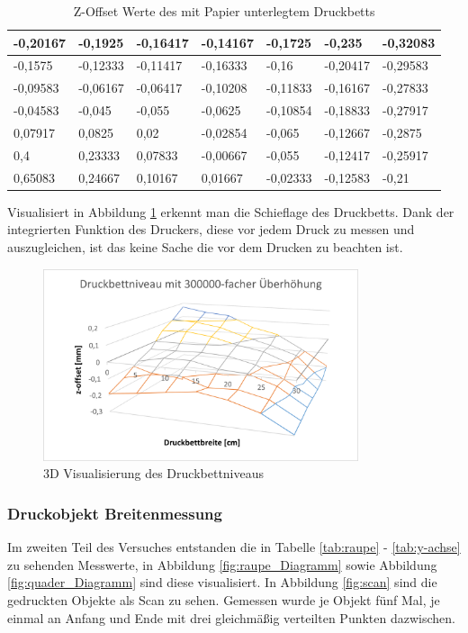\documentclass[a4paper,12pt,bibtotocnumbered]{scrartcl}
\numberwithin{equation}{section} %
\begin{document}
\begin{table}[H]
\centering
\caption{Z-Offset Werte des mit Papier unterlegtem Druckbetts}
\label{tab:druckbett2}
\begin{tabular}{|l|l|l|l|l|l|l|}
\hline
-0,20167 & -0,1925  & -0,16417 & -0,14167 & -0,1725  & -0,235   & -0,32083 \\ \hline
-0,1575  & -0,12333 & -0,11417 & -0,16333 & -0,16    & -0,20417 & -0,29583 \\ \hline
-0,09583 & -0,06167 & -0,06417 & -0,10208 & -0,11833 & -0,16167 & -0,27833 \\ \hline
-0,04583 & -0,045   & -0,055   & -0,0625  & -0,10854 & -0,18833 & -0,27917 \\ \hline
0,07917  & 0,0825   & 0,02     & -0,02854 & -0,065   & -0,12667 & -0,2875  \\ \hline
0,4      & 0,23333  & 0,07833  & -0,00667 & -0,055   & -0,12417 & -0,25917 \\ \hline
0,65083  & 0,24667  & 0,10167  & 0,01667  & -0,02333 & -0,12583 & -0,21    \\ \hline
\end{tabular}
\end{table}

Visualisiert in Abbildung \ref*{fig:druckbett3d} erkennt man die Schieflage des Druckbetts. Dank der integrierten Funktion des Druckers, diese vor jedem Druck zu messen und auszugleichen, ist das keine Sache die vor dem Drucken zu beachten ist.

\begin{figure}[H]
\centerline{\includegraphics[width=350px]{./images/diagramm.png}}
\caption{3D Visualisierung des Druckbettniveaus}
\label{fig:druckbett3d}
\end{figure}


\subsubsection*{Druckobjekt Breitenmessung}
Im zweiten Teil des Versuches entstanden die in Tabelle \ref*{tab:raupe} - \ref*{tab:y-achse} zu sehenden Messwerte, in Abbildung \ref*{fig:raupe_Diagramm} sowie Abbildung \ref*{fig:quader_Diagramm} sind diese visualisiert. In Abbildung \ref*{fig:scan} sind die gedruckten Objekte als Scan zu sehen. Gemessen wurde je Objekt fünf Mal, je einmal an Anfang und Ende mit drei gleichmäßig verteilten Punkten dazwischen.
\end{document}
